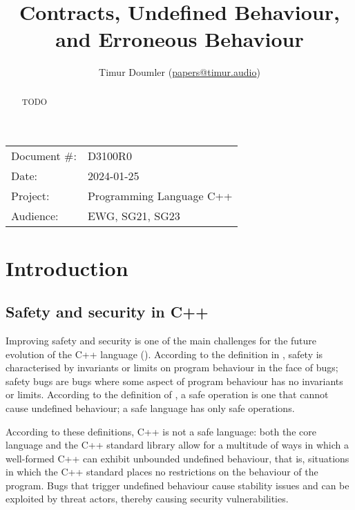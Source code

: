 

 \usepackage[bottom]{footmisc} 


\title{Contracts, Undefined Behaviour, and Erroneous Behaviour}
\author{ Timur Doumler \small(\href{mailto:papers@timur.audio}{papers@timur.audio})  
}
\date{}
\maketitle

\begin{tabular}{ll}
Document \#: & D3100R0 \\
Date: &2024-01-25 \\
Project: & Programming Language C++ \\
Audience: & EWG, SG21, SG23
\end{tabular}

\begin{abstract}
TODO
\end{abstract}

\section{Introduction}
\label{sec:intro}

\subsection{Safety and security in C++}


Improving safety and security is one of the main challenges for the future evolution of the C++ language (\cite{Bastien2023}). According to the definition in \cite{Carruth2023}, safety is characterised by invariants or limits on program behaviour in the face of bugs; safety bugs are bugs where some aspect of program behaviour has no invariants or limits. According to the definition of \cite{Abrahams2023}, a safe operation is one that cannot cause undefined behaviour; a safe language has only safe operations. 

According to these definitions, C++ is not a safe language: both the core language and the C++ standard library allow for a multitude of ways in which a well-formed C++ can exhibit unbounded undefined behaviour, that is, situations in which the C++ standard places no restrictions on the behaviour of the program. Bugs that trigger undefined behaviour cause stability issues and can be exploited by threat actors, thereby causing security vulnerabilities.

